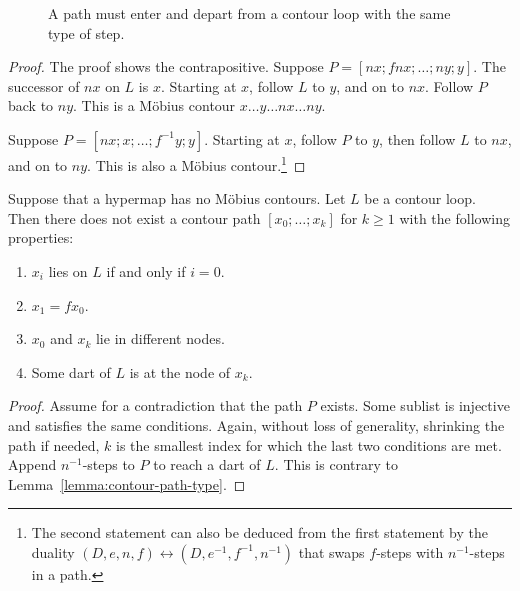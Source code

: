 \begin{figure}[htb]
\centering
{}
\caption{A path must enter and depart from a contour loop with the
same type of step.}
\label{fig:interior_nf}
\end{figure}


\begin{proof} The proof shows the contrapositive.  Suppose $P=[n x;f n
x;\ldots;n y;y]$.  The successor of $n x$ on $L$ is $x$.  Starting
at $x$, follow $L$ to $y$, and on to $n x$.  Follow $P$ back to $n
y$.
This is a M\"obius contour $x\ldots y\ldots n x\ldots n y$.

Suppose $P=[n x;x;\ldots;f^{-1} y;y]$.  Starting at $x$, follow $P$ to
$y$, then follow $L$ to $n x$, and on to $n y$.  This is also a M\"obius
contour.\footnote{The second statement can also be deduced from the first statement
by the duality $(D,e,n,f)\leftrightarrow (D,e^{-1},f^{-1},n^{-1})$ that swaps
$f$-steps with $n^{-1}$-steps in a path.}
\end{proof}



\begin{lemma}\label{lemma:contour-f}
Suppose that a hypermap has no M\"obius contours.  Let $L$ be a
contour loop.  Then there does not exist a contour path
$[x_0;\ldots;x_k]$ for $k\ge 1$ with the following properties:
\begin{enumerate}
\item $x_i$ lies on $L$ if and only if $i=0$.
\item $x_1 = f x_0$.
\item $x_0$ and $x_k$ lie in different nodes.
\item Some dart of $L$ is at the node of $x_k$.
\end{enumerate}
\end{lemma}


\begin{proof} Assume for a contradiction that the path $P$ exists.
Some sublist is injective and satisfies the same conditions.  Again,
without loss of generality, shrinking the path if needed, $k$ is the
smallest index for which the last two conditions are met.  Append
$n^{-1}$-steps to $P$ to reach a dart of $L$.  This is contrary to
Lemma~\ref{lemma:contour-path-type}.
\end{proof}

